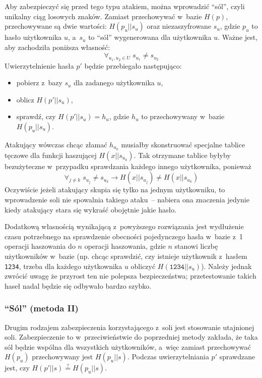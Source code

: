 Aby zabezpieczyć się przed tego typu atakiem, można wprowadzić ``sól'', czyli
unikalny ciąg losowych znaków. Zamiast przechowywać w~bazie $H(p)$,
przechowywane są dwie wartości: $H(p_u || s_u)$ oraz niezaszyfrowane $s_u$,
gdzie $p_u$ to hasło użytkownika $u$, a~$s_u$ to ``sól'' wygenerowana dla
użytkownika $u$. Ważne jest, aby zachodziła poniższa własność:
    $$\forall_{u_1, u_2 \in U} \; s_{u_1} \neq s_{u_2}$$
Uwierzytelnienie hasła $p'$ będzie przebiegało następująco:

\begin{itemize}
\item pobierz z~bazy $s_u$ dla zadanego użytkownika $u$,
\item oblicz $H(p'||s_u)$,
\item sprawdź, czy $H(p'||s_u) = h_u$, gdzie $h_u$ to przechowywany w~bazie
$H(p_u||s_u)$.
\end{itemize}

Atakujący wówczas chcąc złamać $h_{u_k}$ musiałby skonstruować specjalne
tablice tęczowe dla funkcji haszującej $H(x||s_{u_k})$. Tak otrzymane tablice
byłyby bezużyteczne w~przypadku sprawdzania każdego innego użytkownika,
ponieważ
    $$\forall_{j \neq k} \; s_{u_j} \neq s_{u_k} \rightarrow H(x||s_{u_j}) \neq
    H(x||s_{u_k})$$
Oczywiście jeżeli atakujący skupia się tylko na jednym użytkowniku, to
wprowadzenie soli nie spowalnia takiego ataku~-- nabiera ona znaczenia jedynie
kiedy atakujący stara się wykraść obojętnie jakie hasło.

Dodatkową własnością wynikającą z~powyższego rozwiązania jest wydłużenie czasu
potrzebnego na sprawdzenie obecności pojedynczego hasła w~bazie z~1 operacji
haszowania do $n$ operacji haszowania, gdzie $n$ stanowi liczbę użytkowników
w~bazie (np. chcąc sprawdzić, czy istnieje użytkownik z~hasłem \texttt{1234},
trzeba dla każdego użytkownika $u$ obliczyć $H(\texttt{1234}||s_u)$). Należy
jednak zwrócić uwagę że przyrost ten nie polepsza bezpieczeństwa;
przetestowanie takich haseł nadal będzie się odbywało bardzo szybko.

\label{salt_2}
\subsubsection{``Sól'' (metoda II)}
Drugim rodzajem zabezpieczenia korzystającego z~soli jest stosowanie utajnionej
soli. Zabezpieczenie to w~przeciwieństwie do poprzedniej metody zakłada, że
taka sól będzie wspólna dla wszystkich użytkowników, a~więc zamiast
przechowywać $H(p_u)$ przechowywany jest $H(p_u||s)$. Podczas uwierzytelniania
$p'$ sprawdzane jest, czy $H(p'||s) \stackrel{?}{=} H(p_u||s)$.

